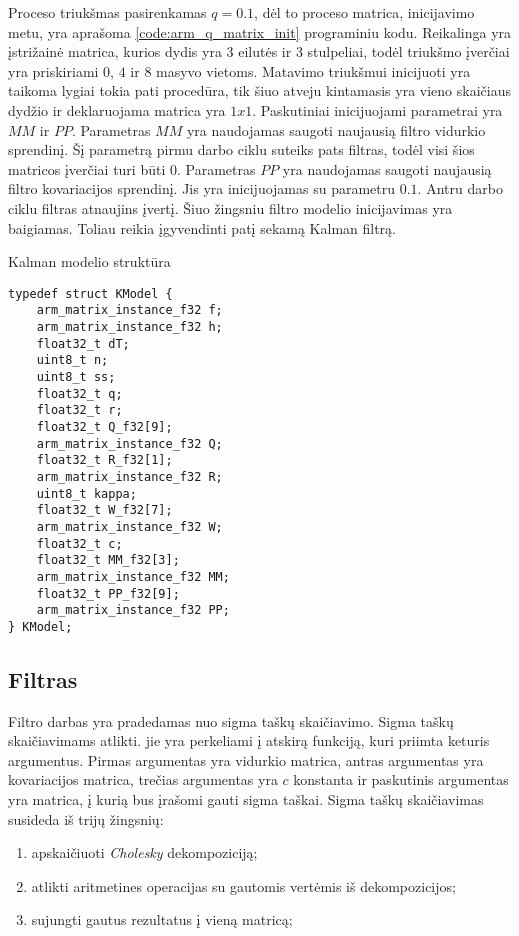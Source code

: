 Proceso triukšmas pasirenkamas $q = 0.1$, dėl to proceso matrica, inicijavimo metu, yra aprašoma \ref{code:arm_q_matrix_init} programiniu kodu.
Reikalinga yra įstrižainė matrica, kurios dydis yra 3 eilutės ir 3 stulpeliai, todėl triukšmo įverčiai yra priskiriami $0$, $4$ ir $8$ masyvo vietoms.
Matavimo triukšmui inicijuoti yra taikoma lygiai tokia pati procedūra, tik šiuo atveju kintamasis yra vieno skaičiaus dydžio ir deklaruojama matrica yra $1x1$.
Paskutiniai inicijuojami parametrai yra $MM$ ir $PP$.
Parametras $MM$ yra naudojamas saugoti naujausią filtro vidurkio sprendinį.
Šį parametrą pirmu darbo ciklu suteiks pats filtras, todėl visi šios matricos įverčiai turi būti $0$.
Parametras $PP$ yra naudojamas saugoti naujausią filtro kovariacijos sprendinį.
Jis yra inicijuojamas su parametru $0.1$.
Antru darbo ciklu filtras atnaujins įvertį.
Šiuo žingsniu filtro modelio inicijavimas yra baigiamas.
Toliau reikia įgyvendinti patį sekamą Kalman filtrą.

\begin{cfigure}
  \centering
  \caption{Kalman modelio struktūra}
  \label{code:kalman_model_struct}
  \begin{lstlisting}
typedef struct KModel {
    arm_matrix_instance_f32 f;
    arm_matrix_instance_f32 h;
    float32_t dT;
    uint8_t n;
    uint8_t ss;
    float32_t q;
    float32_t r;
    float32_t Q_f32[9];
    arm_matrix_instance_f32 Q;
    float32_t R_f32[1];
    arm_matrix_instance_f32 R;
    uint8_t kappa;
    float32_t W_f32[7];
    arm_matrix_instance_f32 W;
    float32_t c;
    float32_t MM_f32[3];
    arm_matrix_instance_f32 MM;
    float32_t PP_f32[9];
    arm_matrix_instance_f32 PP;
} KModel;
  \end{lstlisting}
\end{cfigure}


\subsection{Filtras}

Filtro darbas yra pradedamas nuo sigma taškų skaičiavimo.
Sigma taškų skaičiavimams atlikti. jie yra perkeliami į atskirą funkciją, kuri priimta keturis argumentus.
Pirmas argumentas yra vidurkio matrica, antras argumentas yra kovariacijos matrica, trečias argumentas yra $c$ konstanta ir paskutinis argumentas yra matrica, į kurią bus įrašomi gauti sigma taškai.
Sigma taškų skaičiavimas susideda iš trijų žingsnių:

\begin{enumerate}
    \item apskaičiuoti \textit{Cholesky} dekompoziciją;
    \item atlikti aritmetines operacijas su gautomis vertėmis iš dekompozicijos;
    \item sujungti gautus rezultatus į vieną matricą;
\end{enumerate}

